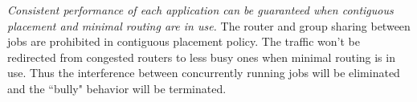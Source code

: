 \emph{Consistent performance of each application can be guaranteed when contiguous placement and minimal routing are in use.} The router and group sharing between jobs are prohibited in contiguous placement policy. The traffic won't be redirected from congested routers to less busy ones when minimal routing is in use. Thus the interference between concurrently running jobs will be eliminated and the ``bully" behavior will be terminated. 


